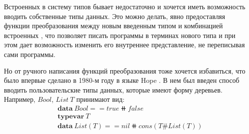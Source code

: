 \label{inductive-definitions}
Встроенных в систему типов бывает недостаточно и хочется иметь
возможность вводить собственные типы данных. Это можно делать, явно
предоставляя функции преобразования между новым введенным типом и
комбинацией встроенных
\cite{transformation-system-for-developing-recursive-programs},
что позволяет писать программы в терминах нового типа и при этом дает возможность
изменить его внутреннее представление, не переписывая сами программы.

Но от ручного написания функций преобразования тоже хочется избавиться,
что было впервые сделано в 1980-м году в языке Hope
\cite{hope-an-experimental-applicative-language}.
В нем был введен способ вводить пользовательские типы данных, которые имеют форму деревьев.
Например, \(Bool\), \(List\ T\) принимают вид:
\begin{align*}
&\mathbf{data}\ Bool == true \doubleplus false\\
&\mathbf{typevar}\ T\\
&\mathbf{data}\ List(T) == nil \doubleplus cons(T \# List(T))
\end{align*}

